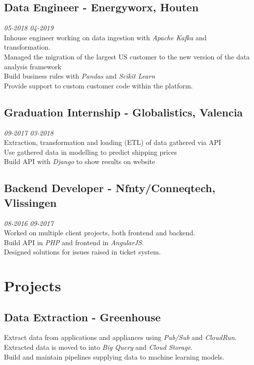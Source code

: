 \documentclass{article}
\begin{document}
\subsection{Data Engineer - Energyworx, Houten} \hfill {\em 05-2018 04-2019} \\
Inhouse engineer working on data ingestion with \emph{Apache Kafka} and transformation. \\
Managed the migration of the largest US customer to the new version of the data analysis framework \\
Build business rules with \emph{Pandas} and \emph{Scikit Learn} \\ 
Provide support to custom customer code within the platform. \\

\subsection{Graduation Internship - Globalistics, Valencia} \hfill {\em 09-2017 03-2018} \\
Extraction, transformation and loading (ETL) of data gathered via API \\
Use gathered data in modelling to predict shipping prices \\
Build API with \emph{Django} to show results on website \\


\subsection{Backend Developer - Nfnty/Conneqtech, Vlissingen} \hfill {\em 08-2016 09-2017} \\
Worked on multiple client projects, both frontend and backend. \\
Build API in \emph{PHP} and frontend in \emph{AngularJS}. \\
Designed solutions for issues raised in ticket system. \\


\section{Projects}
\subsection{Data Extraction - Greenhouse}
Extract data from applications and appliances using \emph{Pub/Sub} and \emph{CloudRun}. Extracted data is moved to into \emph{Big Query} and \emph{Cloud Storage}. \\
Build and maintain pipelines supplying data to machine learning models. \\
\end{document}
